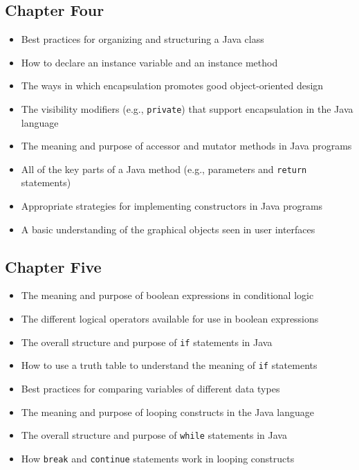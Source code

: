 \subsection*{Chapter Four}
\vspace*{-.1in}

\begin{itemize}

  \itemsep -.015in
  \item Best practices for organizing and structuring a Java class
  \item How to declare an instance variable and an instance method
  \item The ways in which encapsulation promotes good object-oriented design
  \item The visibility modifiers (e.g., {\tt private}) that support encapsulation in the Java language
  \item The meaning and purpose of accessor and mutator methods in Java programs
  \item All of the key parts of a Java method (e.g., parameters and {\tt return} statements)
  \item Appropriate strategies for implementing constructors in Java programs
  \item A basic understanding of the graphical objects seen in user interfaces

\end{itemize}

\vspace*{-.25in}
\subsection*{Chapter Five}
\vspace*{-.1in}

\begin{itemize}

  \itemsep -.015in
  \item The meaning and purpose of boolean expressions in conditional logic
  \item The different logical operators available for use in boolean expressions
  \item The overall structure and purpose of {\tt if} statements in Java
  \item How to use a truth table to understand the meaning of {\tt if} statements
  \item Best practices for comparing variables of different data types
  \item The meaning and purpose of looping constructs in the Java language
  \item The overall structure and purpose of {\tt while} statements in Java
  \item How {\tt break} and {\tt continue} statements work in looping constructs

\end{itemize}


